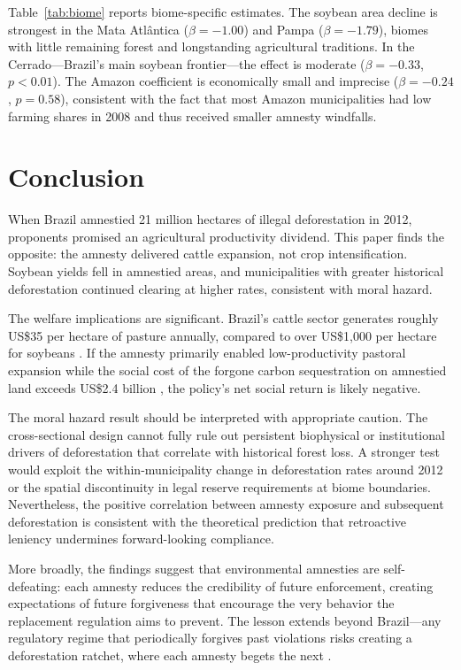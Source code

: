 \documentclass[12pt]{article}
\begin{document}


Table~\ref{tab:biome} reports biome-specific estimates. The soybean area decline is strongest in the Mata Atl\^{a}ntica ($\beta = -1.00$) and Pampa ($\beta = -1.79$), biomes with little remaining forest and longstanding agricultural traditions. In the Cerrado---Brazil's main soybean frontier---the effect is moderate ($\beta = -0.33$, $p < 0.01$). The Amazon coefficient is economically small and imprecise ($\beta = -0.24$, $p = 0.58$), consistent with the fact that most Amazon municipalities had low farming shares in 2008 and thus received smaller amnesty windfalls.


\section{Conclusion}

When Brazil amnestied 21 million hectares of illegal deforestation in 2012, proponents promised an agricultural productivity dividend. This paper finds the opposite: the amnesty delivered cattle expansion, not crop intensification. Soybean yields fell in amnestied areas, and municipalities with greater historical deforestation continued clearing at higher rates, consistent with moral hazard.

The welfare implications are significant. Brazil's cattle sector generates roughly US\$35 per hectare of pasture annually, compared to over US\$1,000 per hectare for soybeans \citep{lapola2014pervasive}. If the amnesty primarily enabled low-productivity pastoral expansion while the social cost of the forgone carbon sequestration on amnestied land exceeds US\$2.4 billion \citep{soares2014forest}, the policy's net social return is likely negative.

The moral hazard result should be interpreted with appropriate caution. The cross-sectional design cannot fully rule out persistent biophysical or institutional drivers of deforestation that correlate with historical forest loss. A stronger test would exploit the within-municipality change in deforestation rates around 2012 or the spatial discontinuity in legal reserve requirements at biome boundaries. Nevertheless, the positive correlation between amnesty exposure and subsequent deforestation is consistent with the theoretical prediction that retroactive leniency undermines forward-looking compliance.

More broadly, the findings suggest that environmental amnesties are self-defeating: each amnesty reduces the credibility of future enforcement, creating expectations of future forgiveness that encourage the very behavior the replacement regulation aims to prevent. The lesson extends beyond Brazil---any regulatory regime that periodically forgives past violations risks creating a deforestation ratchet, where each amnesty begets the next \citep{koch2019slippery}.
\end{document}
